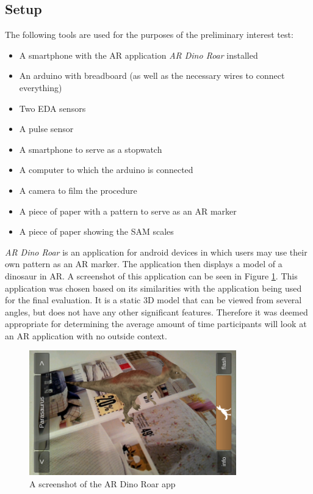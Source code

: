\subsection{Setup}
The following tools are used for the purposes of the preliminary interest test:

\begin{itemize}
    \item A smartphone with the AR application \textit{AR Dino Roar} installed
    \item An arduino with breadboard (as well as the necessary wires to connect everything)
    \item Two EDA sensors
    \item A pulse sensor
    \item A smartphone to serve as a stopwatch
    \item A computer to which the arduino is connected
    \item A camera to film the procedure
    \item A piece of paper with a pattern to serve as an AR marker
    \item A piece of paper showing the SAM scales
\end{itemize}

\textit{AR Dino Roar} is an application for android devices in which users may use their own pattern as an AR marker. The application then displays a model of a dinosaur in AR. A screenshot of this application can be seen in Figure \ref{fig:dino}. This application was chosen based on its similarities with the application being used for the final evaluation. It is a static 3D model that can be viewed from several angles, but does not have any other significant features. Therefore it was deemed appropriate for determining the average amount of time participants will look at an AR application with no outside context. 

\begin{figure}[h!]
	\centering
    \includegraphics[width=0.8\textwidth]{figures/AR_dino.png}
    \caption{A screenshot of the AR Dino Roar app \cite{ARDino}}\label{fig:dino}
\end{figure}

